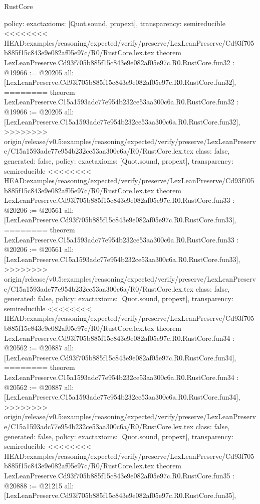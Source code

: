 \begin{lexlean}{RustCore}
\begin{coremodule}
{\begin{coremodule}
{{{{{{{{{{{{{{{{{{{{{{{{{{{{{{{{{{{  policy: exact{axioms: [Quot.sound, propext]},
  transparency: semireducible
}
<<<<<<<< HEAD:examples/reasoning/expected/verify/preserve/LexLeanPreserve/Cd93f705b885f15c843e9e082af05e97c/R0/RustCore.lex.tex
theorem LexLeanPreserve.Cd93f705b885f15c843e9e082af05e97c.R0.RustCore.fun32 : @19966 := @20205 {
  all: [LexLeanPreserve.Cd93f705b885f15c843e9e082af05e97c.R0.RustCore.fun32],
========
theorem LexLeanPreserve.C15a1593adc77e954b232ce53aa300c6a.R0.RustCore.fun32 : @19966 := @20205 {
  all: [LexLeanPreserve.C15a1593adc77e954b232ce53aa300c6a.R0.RustCore.fun32],
>>>>>>>> origin/release/v0.5:examples/reasoning/expected/verify/preserve/LexLeanPreserve/C15a1593adc77e954b232ce53aa300c6a/R0/RustCore.lex.tex
  class: false,
  generated: false,
  policy: exact{axioms: [Quot.sound, propext]},
  transparency: semireducible
}
<<<<<<<< HEAD:examples/reasoning/expected/verify/preserve/LexLeanPreserve/Cd93f705b885f15c843e9e082af05e97c/R0/RustCore.lex.tex
theorem LexLeanPreserve.Cd93f705b885f15c843e9e082af05e97c.R0.RustCore.fun33 : @20206 := @20561 {
  all: [LexLeanPreserve.Cd93f705b885f15c843e9e082af05e97c.R0.RustCore.fun33],
========
theorem LexLeanPreserve.C15a1593adc77e954b232ce53aa300c6a.R0.RustCore.fun33 : @20206 := @20561 {
  all: [LexLeanPreserve.C15a1593adc77e954b232ce53aa300c6a.R0.RustCore.fun33],
>>>>>>>> origin/release/v0.5:examples/reasoning/expected/verify/preserve/LexLeanPreserve/C15a1593adc77e954b232ce53aa300c6a/R0/RustCore.lex.tex
  class: false,
  generated: false,
  policy: exact{axioms: [Quot.sound, propext]},
  transparency: semireducible
}
<<<<<<<< HEAD:examples/reasoning/expected/verify/preserve/LexLeanPreserve/Cd93f705b885f15c843e9e082af05e97c/R0/RustCore.lex.tex
theorem LexLeanPreserve.Cd93f705b885f15c843e9e082af05e97c.R0.RustCore.fun34 : @20562 := @20887 {
  all: [LexLeanPreserve.Cd93f705b885f15c843e9e082af05e97c.R0.RustCore.fun34],
========
theorem LexLeanPreserve.C15a1593adc77e954b232ce53aa300c6a.R0.RustCore.fun34 : @20562 := @20887 {
  all: [LexLeanPreserve.C15a1593adc77e954b232ce53aa300c6a.R0.RustCore.fun34],
>>>>>>>> origin/release/v0.5:examples/reasoning/expected/verify/preserve/LexLeanPreserve/C15a1593adc77e954b232ce53aa300c6a/R0/RustCore.lex.tex
  class: false,
  generated: false,
  policy: exact{axioms: [Quot.sound, propext]},
  transparency: semireducible
}
<<<<<<<< HEAD:examples/reasoning/expected/verify/preserve/LexLeanPreserve/Cd93f705b885f15c843e9e082af05e97c/R0/RustCore.lex.tex
theorem LexLeanPreserve.Cd93f705b885f15c843e9e082af05e97c.R0.RustCore.fun35 : @20888 := @21215 {
  all: [LexLeanPreserve.Cd93f705b885f15c843e9e082af05e97c.R0.RustCore.fun35],
}}}}}}}}}}}}}}}}}}}}}}}}}}}}}}}}}}}}}}
\end{coremodule}}
\end{coremodule}
\end{lexlean}
